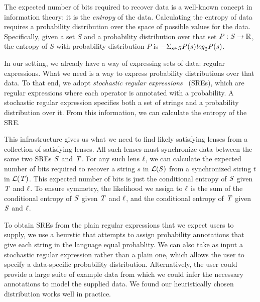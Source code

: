 \documentclass[acmsmall,screen,anonymous]{acmart}
\begin{document}
The expected number of bits required to recover data is a well-known concept in
information theory: it is the \emph{entropy} of the data. Calculating the
entropy of data requires a probability distribution over the space of possible
values for the data. Specifically, given a set $S$ and a probability
distribution over that set $P : S \rightarrow \mathbb{R}$, the entropy of $S$
with probability distribution $P$ is $-\Sigma_{s\in S}P(s)\mathit{log}_2P(s)$.

In our setting, we already have a way of expressing sets of data:
regular expressions.  What we need is a way to express probability
distributions over that data.
To that end, we adopt \emph{stochastic regular expressions}~\cite{?} (SREs), 
which are regular expressions where each operator is annotated with a
probability.  A stochastic regular expression
specifies both a set of strings and a probability
distribution over it.  From this information, we can calculate the
entropy of the SRE. 

This infrastructure gives us what we need to find likely satisfying lenses from
a collection of satisfying lenses. All such lenses must synchronize data between
the same two SREs $\mathit{S}$ and $\mathit{T}$. For any such lens $\mathit{\ell}$, we can
calculate the expected number of bits required to recover a string $s$ in
$\mathcal{L}(\mathit{S})$ from a synchronized string $t$ in
$\mathcal{L}(\mathit{T})$. This expected number of bits is just the conditional
entropy of $\mathit{S}$ given $\mathit{T}$ and $\mathit{\ell}$. To ensure symmetry, the
likelihood we assign to $\mathit{\ell}$ is the sum of the conditional entropy of
$\mathit{S}$ given $\mathit{T}$ and $\mathit{\ell}$,  and the conditional entropy of $\mathit{T}$ given $\mathit{S}$ and
$\mathit{\ell}$.

To obtain SREs from the plain regular expressions that
we expect users to supply, we use a heurstic that attempts to assign probability
annotations that give each string in the language equal probablity. We can also
take as input a stochastic regular expression rather than a plain one, which
allows the user to specify a data-specific probability distribution.
Alternatively, the user could provide a large suite of example data from which
we could infer the necessary annotations to model the supplied data. We found
our heuristically chosen distribution works well in practice.
\end{document}
